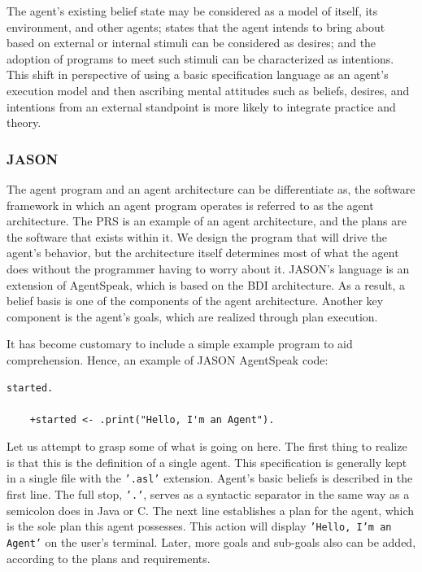 The agent's existing belief state may be considered as a model of itself, its environment, and other agents; states that the agent intends to bring about based on external or internal stimuli can be considered as desires; and the adoption of programs to meet such stimuli can be characterized as intentions. This shift in perspective of using a basic specification language as an agent's execution model and then ascribing mental attitudes such as beliefs, desires, and intentions from an external standpoint is more likely to integrate practice and theory.

\subsubsection{JASON}

The agent program and an agent architecture can be differentiate as, the software framework in which an agent program operates is referred to as the agent architecture. The \ac{PRS} is an example of an agent architecture, and the plans are the software that exists within it. We design the program that will drive the agent's behavior, but the architecture itself determines most of what the agent does without the programmer having to worry about it. JASON's language is an extension of AgentSpeak, which is based on the \ac{BDI} architecture. As a result, a belief basis is one of the components of the agent architecture. Another key component is the agent's goals, which are realized through plan execution.

\vspace{.5cm}

It has become customary to include a simple example program to aid comprehension. Hence, an example of JASON AgentSpeak code:

\vspace{.5cm}

\begin{lstlisting}[backgroundcolor = \color{white}, frame=none, numbers=none]
    started.

    +started <- .print("Hello, I'm an Agent").
\end{lstlisting}

\vspace{.5cm}

Let us attempt to grasp some of what is going on here. The first thing to realize is that this is the definition of a single agent. This specification is generally kept in a single file with the \texttt{'.asl'} extension. Agent's basic beliefs is described in the first line. The full stop, \texttt{'.'}, serves as a syntactic separator in the same way as a semicolon does in Java or C. The next line establishes a plan for the agent, which is the sole plan this agent possesses. This action will display \texttt{'Hello, I'm an Agent'} on the user's terminal. Later, more goals and sub-goals also can be added, according to the plans and requirements.

